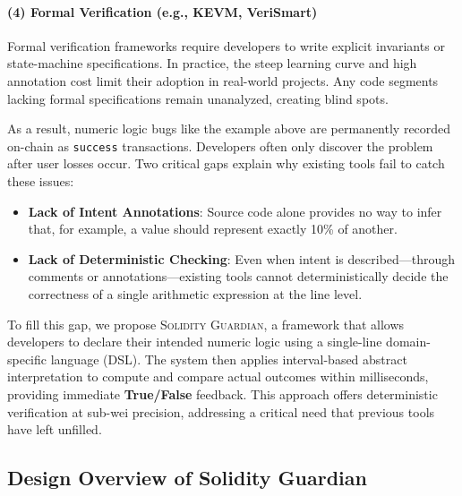 \documentclass[10pt, conference]{IEEEtran}
\begin{document}
\paragraph{(4) Formal Verification (e.g., KEVM, VeriSmart)}
Formal verification frameworks require developers to write explicit invariants or state-machine specifications. In practice, the steep learning curve and high annotation cost limit their adoption in real-world projects. Any code segments lacking formal specifications remain unanalyzed, creating blind spots.

\smallskip

As a result, numeric logic bugs like the example above are permanently recorded on-chain as \texttt{success} transactions. Developers often only discover the problem after user losses occur. Two critical gaps explain why existing tools fail to catch these issues:
\begin{itemize}
    \item \textbf{Lack of Intent Annotations}: Source code alone provides no way to infer that, for example, a value should represent exactly 10\% of another.
    \item \textbf{Lack of Deterministic Checking}: Even when intent is described—through comments or annotations—existing tools cannot deterministically decide the correctness of a single arithmetic expression at the line level.
\end{itemize}

To fill this gap, we propose \textsc{Solidity Guardian}, a framework that allows developers to declare their intended numeric logic using a single-line domain-specific language (DSL). The system then applies interval-based abstract interpretation to compute and compare actual outcomes within milliseconds, providing immediate \textbf{True/False} feedback. This approach offers deterministic verification at sub-wei precision, addressing a critical need that previous tools have left unfilled.


\subsection{Design Overview of Solidity Guardian}
\end{document}
